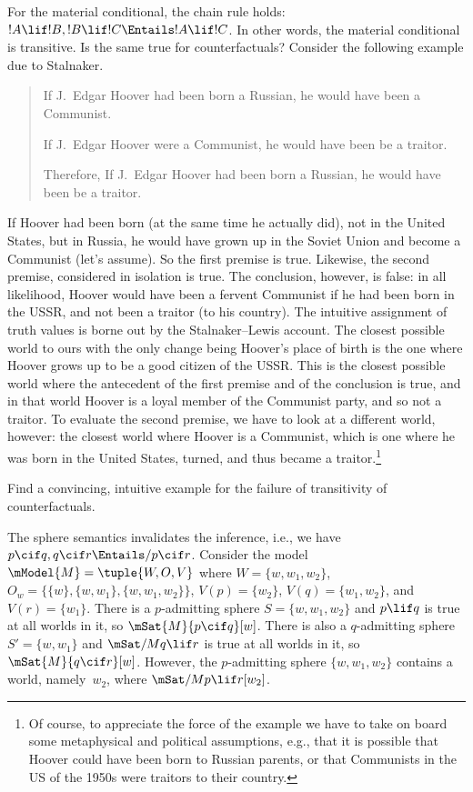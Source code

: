 \documentclass[../../../include/open-logic-section]{subfiles}
\begin{document}


For the material conditional, the chain rule holds: $!A \lif !B, !B
\lif !C \Entails !A \lif !C$. In other words, the material conditional
is transitive. Is the same true for counterfactuals? Consider the
following example due to Stalnaker.
\begin{quote}
  If J.~Edgar Hoover had been born a Russian, he would have been a Communist.

  If J.~Edgar Hoover were a Communist, he would have been be a traitor.

  Therefore, If J.~Edgar Hoover had been born a Russian, he would have
  been be a traitor.
\end{quote}
If Hoover had been born (at the same time he actually did), not in the
United States, but in Russia, he would have grown up in the Soviet
Union and become a Communist (let's assume). So the first premise is
true. Likewise, the second premise, considered in isolation is
true. The conclusion, however, is false: in all likelihood, Hoover
would have been a fervent Communist if he had been born in the USSR,
and not been a traitor (to his country).  The intuitive assignment of
truth values is borne out by the Stalnaker--Lewis account. The closest
possible world to ours with the only change being Hoover's place of
birth is the one where Hoover grows up to be a good citizen of the
USSR. This is the closest possible world where the antecedent of the
first premise and of the conclusion is true, and in that world Hoover
is a loyal member of the Communist party, and so not a traitor. To
evaluate the second premise, we have to look at a different world,
however: the closest world where Hoover is a Communist, which is one
where he was born in the United States, turned, and thus became a
traitor.\footnote{Of course, to appreciate the force of the example we
  have to take on board some metaphysical and political assumptions,
  e.g., that it is possible that Hoover could have been born to
  Russian parents, or that Communists in the US of the 1950s were
  traitors to their country.}

\begin{prob}
  Find a convincing, intuitive example for the failure of transitivity
  of counterfactuals.
\end{prob}

\begin{ex}
  The sphere semantics invalidates the inference, i.e., we have $p
  \cif q, q \cif r \Entails/ p \cif r$. Consider the model $\mModel{M}
  = \tuple{W, O, V}$ where $W = \{w, w_1, w_2\}$, $O_w = \{\{w\}, \{w,
  w_1\}, \{w, w_1, w_2\}\}$, $V(p) = \{w_2\}$, $V(q) = \{w_1, w_2\}$,
  and $V(r) = \{w_1\}$. There is a $p$-admitting sphere $S = \{w, w_1,
  w_2\}$ and $p \lif q$ is true at all worlds in it, so $\mSat{M}{p
    \cif q}[w]$. There is also a $q$-admitting sphere $S' = \{w,
  w_1\}$ and $\mSat/{M}{q \lif r}$ is true at all worlds in it, so
  $\mSat{M}{q \cif r}[w]$. However, the $p$-admitting sphere $\{w,
  w_1, w_2\}$ contains a world, namely~$w_2$, where $\mSat/{M}{p \lif
    r}[w_2]$.
\end{ex}
\end{document}
